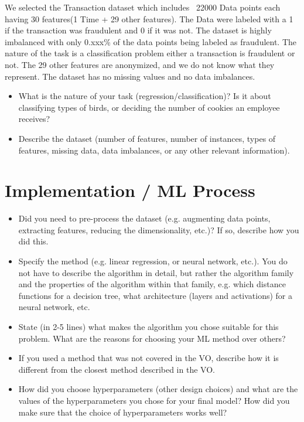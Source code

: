 \documentclass[a4, 10 pt, conference]{ieeeconf}  %
\begin{document}
We selected the Transaction dataset which includes ~22000 Data points each having 30 features(1 Time + 29 other features). The Data were labeled with a 1 if the transaction was fraudulent and 0 if it was not.
The dataset is highly imbalanced with only 0.xxx\% of the data points being labeled as fraudulent. The nature of the task is a classification problem either a transaction is fraudulent or not.
The 29 other features are anonymized, and we do not know what they represent. The dataset has no missing values and no data imbalances.
{\color{blue}
\begin{itemize}
  \item What is the nature of your task (regression/classification)? Is it about classifying types of birds, or deciding the number of cookies an employee receives?
  \item Describe the dataset (number of features, number of instances, types of features, missing data, data imbalances, or any other relevant information).
\end{itemize}
}

\section{Implementation / ML Process}
\label{sec:methods}

{\color{blue}

  \begin{itemize}
    \item Did you need to pre-process the dataset (e.g. augmenting data points, extracting features, reducing the dimensionality, etc.)? If so, describe how you did this.
    \item Specify the method (e.g. linear regression, or neural network, etc.). You do not have to describe the algorithm in detail, but rather the algorithm family and the properties of the algorithm within that family, e.g. which distance functions for a decision tree, what architecture (layers and activations) for a neural network, etc.
    \item State (in 2-5 lines) what makes the algorithm you chose suitable for this problem. What are the reasons for choosing your ML method over others?
    \item If you used a method that was not covered in the VO, describe how it is different from the closest method described in the VO.
    \item How did you choose hyperparameters (other design choices) and what are the values of the hyperparameters you chose for your final model? How did you make sure that the choice of hyperparameters works well?
  \end{itemize}
}
\end{document}
